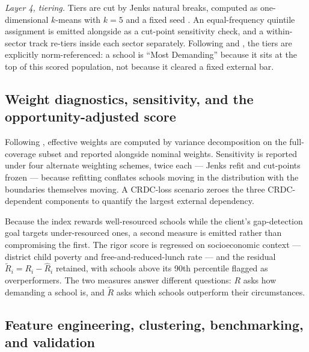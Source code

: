\documentclass[12pt]{article}
\begin{document}
\emph{Layer 4, tiering.} Tiers are cut by Jenks natural breaks, computed as one-dimensional $k$-means with $k = 5$ and a fixed seed \citep{jenks1967,fisher1958}. An equal-frequency quintile assignment is emitted alongside as a cut-point sensitivity check, and a within-sector track re-tiers inside each sector separately. Following \citet{glaser1963} and \citet{cizek2007}, the tiers are explicitly norm-referenced: a school is ``Most Demanding'' because it sits at the top of this scored population, not because it cleared a fixed external bar.

\subsection{Weight diagnostics, sensitivity, and the opportunity-adjusted score}

Following \citet{cadre2024}, effective weights are computed by variance decomposition on the full-coverage subset and reported alongside nominal weights. Sensitivity is reported under four alternate weighting schemes, twice each --- Jenks refit and cut-points frozen --- because refitting conflates schools moving in the distribution with the boundaries themselves moving. A CRDC-loss scenario zeroes the three CRDC-dependent components to quantify the largest external dependency.

Because the index rewards well-resourced schools while the client's gap-detection goal targets under-resourced ones, a second measure is emitted rather than compromising the first. The rigor score is regressed on socioeconomic context --- district child poverty and free-and-reduced-lunch rate --- and the residual $\tilde{R}_i = R_i - \hat{R}_i$ retained, with schools above its 90th percentile flagged as overperformers. The two measures answer different questions: $R$ asks how demanding a school is, and $\tilde{R}$ asks which schools outperform their circumstances.

\subsection{Feature engineering, clustering, benchmarking, and validation}
\end{document}
